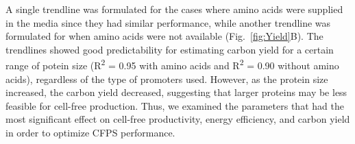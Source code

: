 \documentclass[journal=asbcd6,manuscript=article]{achemso}
\begin{document}
A single trendline was formulated for the cases where amino acids were supplied in the media since they had similar performance, while another trendline was formulated for when amino acids were not available (Fig.~\ref{fig:Yield}B).
The trendlines showed good predictability for estimating carbon yield for a certain range of potein size (R\textsuperscript{2} = 0.95 with amino acids and R\textsuperscript{2} = 0.90 without amino acids), regardless of the type of promoters used.
However, as the protein size increased, the carbon yield decreased, suggesting that larger proteins may be less feasible for cell-free production.
Thus, we examined the parameters that had the most significant effect on cell-free productivity, energy efficiency, and carbon yield in order to optimize CFPS performance.
\end{document}

